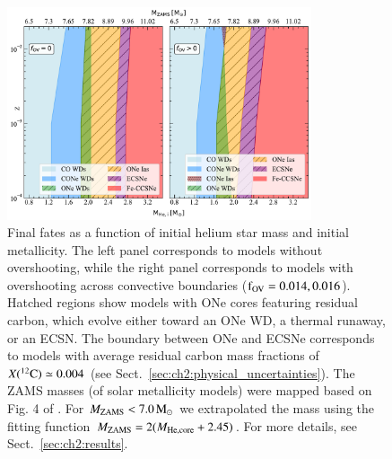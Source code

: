 \documentclass[main.tex]{subfiles}
\begin{document}
\begin{figure}[h!]
    \centering
    \includegraphics[width=0.8\textwidth]{figures/chapter2/final_fates/final_fates_graph_with_farmers_zams.pdf}
    \caption{Final fates as a function of initial helium star mass and initial metallicity. The left panel corresponds to models without overshooting, while the right panel corresponds to models with overshooting across convective boundaries ($\rm f_{OV} = 0.014, 0.016$). Hatched regions show models with ONe cores featuring residual carbon, which evolve either toward an ONe WD, a thermal runaway, or an ECSN.
    The boundary between ONe \ias and ECSNe corresponds to models with average residual carbon mass fractions of $X(\iso{C}{12}) \simeq 0.004$ (see Sect.~\ref{sec:ch2:physical_uncertainties}). 
    The ZAMS masses (of solar metallicity models) were mapped based on Fig. 4 of  \cite{Farmer:2015afs}. For $M_{\rm ZAMS} < 7.0\msun$ we extrapolated the mass using the fitting function $M_{\rm ZAMS} = 2(M_{\rm He, core} + 2.45)$. For more details, see Sect.~\ref{sec:ch2:results}.}
    \label{fig:final_fates}
\end{figure}
\end{document}
